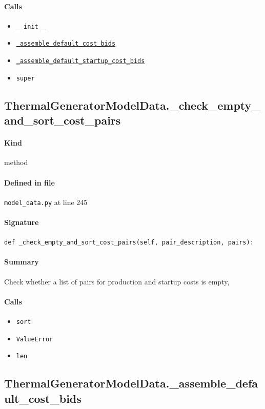 \documentclass[11pt]{report}
\begin{document}
\paragraph{Calls}
\begin{itemize}[leftmargin=*]
  \item \texttt{\_\_init\_\_}
  \item \hyperref[def:model_data.py:ThermalGeneratorModelData._assemble_default_cost_bids:L267]{\texttt{\_assemble\_default\_cost\_bids}}
  \item \hyperref[def:model_data.py:ThermalGeneratorModelData._assemble_default_startup_cost_bids:L303]{\texttt{\_assemble\_default\_startup\_cost\_bids}}
  \item \texttt{super}
\end{itemize}
\subsection{ThermalGeneratorModelData.\_check\_empty\_and\_sort\_cost\_pairs}
\label{def:model_data.py:ThermalGeneratorModelData._check_empty_and_sort_cost_pairs:L245}
\paragraph{Kind} method
\paragraph{Defined in file} \texttt{model\_data.py} at line 245
\paragraph{Signature} \texttt{def \_check\_empty\_and\_sort\_cost\_pairs(self, pair\_description, pairs):}
\paragraph{Summary} Check whether a list of pairs for production and startup costs is empty,
\paragraph{Calls}
\begin{itemize}[leftmargin=*]
  \item \texttt{sort}
  \item \texttt{ValueError}
  \item \texttt{len}
\end{itemize}
\subsection{ThermalGeneratorModelData.\_assemble\_default\_cost\_bids}
\label{def:model_data.py:ThermalGeneratorModelData._assemble_default_cost_bids:L267}
\end{document}
